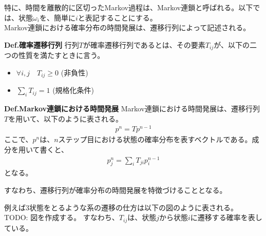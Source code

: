\documentclass[a4paper,11pt]{jsarticle}
\numberwithin{equation}{section}
\begin{document}
特に、時間を離散的に区切ったMarkov過程は、Markov連鎖と呼ばれる。以下では、状態$\omega_{i}$を、簡単に$i$と表記することにする。\\
\indent
Markov連鎖における確率分布の時間発展は、遷移行列によって記述される。

\begin{itembox}[l]{\textbf{Def.確率遷移行列}}
    行列$T$が確率遷移行列であるとは、その要素$T_{ij}$が、以下の二つの性質を満たすときに言う。
    \begin{itemize}
        \item $\forall i,j \quad T_{ij} \geq 0$ (非負性)
        \item $\sum_{i} T_{ij} = 1$ (規格化条件)
    \end{itemize}
\end{itembox}

\begin{itembox}[l]{\textbf{Def.Markov連鎖における時間発展}}
    Markov連鎖における時間発展は、遷移行列$T$を用いて、以下のように表される。
        \begin{align}
            p^{n} = T p^{n-1}
        \end{align}
        ここで、$p^{n}$は、$n$ステップ目における状態の確率分布を表すベクトルである。成分を用いて書くと、
        \begin{align}
            p_{j}^{n} = \sum_{i} T_{ji} p_i^{n-1}
        \end{align}
        となる。
    \end{itembox}
すなわち、遷移行列が確率分布の時間発展を特徴づけることとなる。

例えば3状態をとるような系の遷移の仕方は以下の図のように表される。
TODO: 図を作成する。
すなわち、$T_{ij}$は、状態$j$から状態$i$に遷移する確率を表している。
\end{document}
